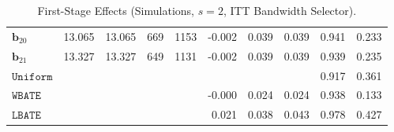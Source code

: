 \documentclass[10pt]{article}
\newcommand{\bb}{\mathbf{b}}
\begin{document}
\begin{table}[p]
\begin{tabular}{lccccrrrrr}
$\bb_{20}$ & 13.065 & 13.065 & 669 & 1153 & -0.002 & 0.039 & 0.039 & 0.941 & 0.233 \\
$\bb_{21}$ & 13.327 & 13.327 & 649 & 1131 & -0.002 & 0.039 & 0.039 & 0.939 & 0.235 \\
\midrule
$\mathtt{Uniform}$ &  &  &  &  &  &  &  & 0.917 & 0.361 \\
\midrule
$\mathtt{WBATE}$ &  &  &  &  & -0.000 & 0.024 & 0.024 & 0.938 & 0.133 \\
\midrule
$\mathtt{LBATE}$ &  &  &  &  & 0.021 & 0.038 & 0.043 & 0.978 & 0.427 \\
\bottomrule\bottomrule
\end{tabular}

    \caption{First-Stage Effects (Simulations, $s=2$, ITT Bandwidth Selector).}
    \label{tab:sa-simuls-fs-s2}
\end{table}
\end{document}
